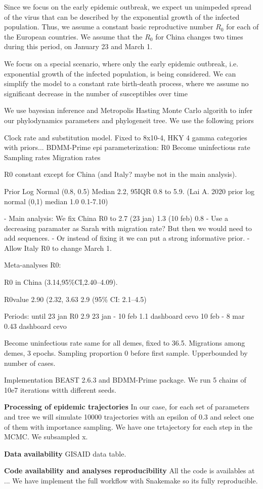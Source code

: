 Since we focus on the early epidemic outbreak, we expect un unimpeded spread of the virus that can be described by the exponential growth of the infected population. Thus, we assume a constant basic reproductive number $R_0$ for each of the European countries. We assume that the $R_0$ for China changes two times during this period, on January 23 and March 1.

We focus on a special scenario, where only the early epidemic outbreak, i.e. exponential growth of the infected population, is being considered. We can simplify the model to a constant rate birth-death process, where we assume no significant decrease in the number of susceptibles over time \cite{TanjaBonhoeffer2014}


We use bayesian inference and Metropolis Hasting Monte Carlo algorith to infer our phylodynamics parameters and phylogeneit tree. We use the following priors

Clock rate and substitution model. Fixed to 8x10-4, HKY 4 gamma categories with priors...
BDMM-Prime epi parameterization:
R0
Become uninfectious rate
Sampling rates
Migration rates


R0 constant except for China (and Italy? maybe not in the main analysis).

Prior Log Normal (0.8, 0.5) Median 2.2, 95IQR 0.8 to 5.9.
(Lai A. 2020 prior log normal (0,1) median 1.0 0.1-7.10)

- Main analysis: We fix China R0 to 2.7 (23 jan) 1.3 (10 feb) 0.8
- Use a decreasing paramater as Sarah with migration rate? But then we would need to add sequences.
- Or instead of fixing it we can put a strong informative prior.
- Allow Italy R0 to change March 1.


Meta-analyses R0:

R0 in China (3.14,95\%CI,2.40–4.09).\cite{Billah2020}

R0value 2.90 (2.32, 3.63
 2.9 (95\% CI: 2.1–4.5)\cite{Park2020}


Periods:
until 23 jan R0 2.9 
23 jan - 10 feb 1.1 dashboard cevo
10 feb - 8 mar 0.43 dashboard cevo



Become uninfectious rate same for all demes, fixed to 36.5.
Migrations among demes, 3 epochs.
Sampling proportion 0 before first sample. Upperbounded by number of cases.

Implementation BEAST 2.6.3 and BDMM-Prime package.
We run 5 chains of 10e7 iterations witth different seeds.


\textbf{Processing of epidemic trajectories}
In our case, for each set of parameters and tree we will simulate 10000 trajectories with an epsilon of 0.3 and select one of them with importance sampling.
We have one trtajectory for each step in the MCMC. We subsampled x. 

\textbf{Data availability}
GISAID data table.

\textbf{Code availability and analyses reproducibility}
All the code is availables at ...
We have implement the full workflow with Snakemake so its fully reproducible.

